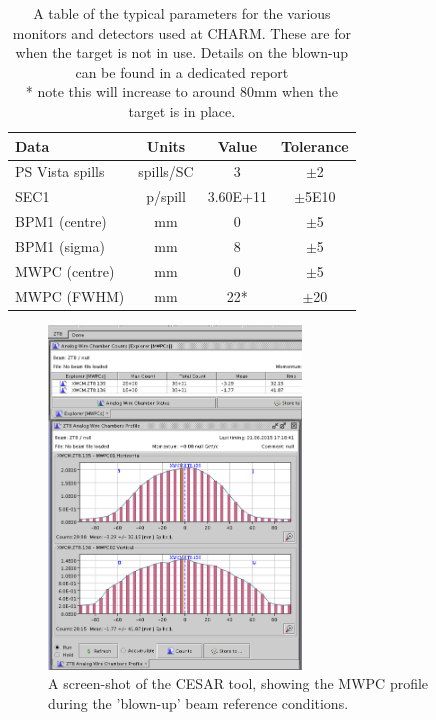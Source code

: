 \begin{table}[!ht]
\begin{center}
	\begin{tabular}{l|c|c|c}
	\textbf{Data} & \textbf{Units} & \textbf{Value} & \textbf{Tolerance}\\ 
	\hline 
	\hline 
	PS Vista spills & spills/SC & 3			& $\pm$2 \\
	SEC1 			& p/spill	& 3.60E+11 	& $\pm$5E10 \\
	BPM1 (centre) 	& mm		& 0			& $\pm$5 \\
	BPM1 (sigma)	& mm		& 8			& $\pm$5 \\
	MWPC (centre)	& mm		& 0			& $\pm$5 \\
	MWPC (FWHM)		& mm		& 22*		& $\pm$20 \\
	\end{tabular}
\caption{A table of the typical parameters for the various monitors and detectors used at CHARM. These are for when the target is not in use. Details on the blown-up can be found in a dedicated report \cite{charmblown} \\ * note this will increase to around 80mm when the target is in place.}
\label{tab:monitor_reference_values}%
\end{center}
\end{table}

\begin{figure}[!ht]
	\centering
	\includegraphics[width=0.6\textwidth]{./images/blown_up_beam}
	\caption{A screen-shot of the CESAR tool, showing the MWPC profile during the 'blown-up' beam reference conditions.}
	\label{fig:beam_reference2}
\end{figure}

